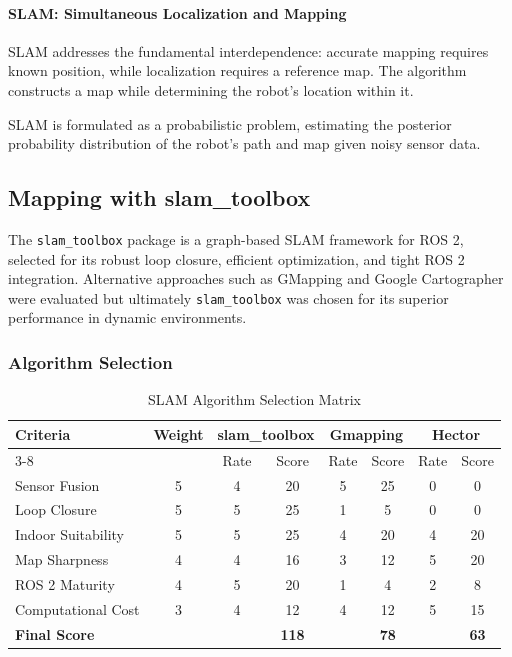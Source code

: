 \paragraph{SLAM: Simultaneous Localization and Mapping}
SLAM addresses the fundamental interdependence: accurate mapping requires known position, while localization requires a reference map. The algorithm constructs a map while determining the robot's location within it.

SLAM is formulated as a probabilistic problem, estimating the posterior probability distribution of the robot's path and map given noisy sensor data.

\subsection{Mapping with slam\_toolbox}
\label{subsec:slam_toolbox}

The \texttt{slam\_toolbox} package is a graph-based SLAM framework for ROS 2, selected for its robust loop closure, efficient optimization, and tight ROS 2 integration. Alternative approaches such as GMapping \cite{grisetti2007improved} and Google Cartographer \cite{hess2016cartographer} were evaluated but ultimately \texttt{slam\_toolbox} was chosen for its superior performance in dynamic environments.

\subsubsection{Algorithm Selection}

\begin{table}[H]
\centering
\caption{SLAM Algorithm Selection Matrix}
\label{tab:slam_selection}
\begin{tabular}{|l|c|c|c|c|c|c|c|}
\hline
\textbf{Criteria} & \textbf{Weight} & \multicolumn{2}{c|}{\textbf{slam\_toolbox}} & \multicolumn{2}{c|}{\textbf{Gmapping}} & \multicolumn{2}{c|}{\textbf{Hector}} \\
\cline{3-8}
 & & Rate & Score & Rate & Score & Rate & Score \\
\hline
Sensor Fusion & 5 & 4 & 20 & 5 & 25 & 0 & 0 \\
\hline
Loop Closure & 5 & 5 & 25 & 1 & 5 & 0 & 0 \\
\hline
Indoor Suitability & 5 & 5 & 25 & 4 & 20 & 4 & 20 \\
\hline
Map Sharpness & 4 & 4 & 16 & 3 & 12 & 5 & 20 \\
\hline
ROS 2 Maturity & 4 & 5 & 20 & 1 & 4 & 2 & 8 \\
\hline
Computational Cost & 3 & 4 & 12 & 4 & 12 & 5 & 15 \\
\hline
\textbf{Final Score} & & & \textbf{118} & & \textbf{78} & & \textbf{63} \\
\hline
\end{tabular}
\end{table}


